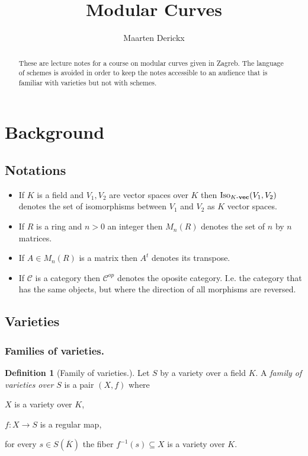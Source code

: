 \documentclass[a4paper,12pt,reqno]{amsart}
\title{Modular Curves}
\author{Maarten Derickx}
\newcommand{\IsoKVec}[1]{\mathrm{Iso}_{#1 {\bf\text{-}vec}}}
\newcommand{\transpose}{t}
\theoremstyle{definition}
\newtheorem{definition}[lemma]{Definition}
\numberwithin{lemma}{section}
\numberwithin{equation}{section}
\numberwithin{figure}{section}
\begin{document}
\begin{abstract}
These are lecture notes for a course on modular curves given in Zagreb. The language of schemes is avoided in order to keep the notes accessible to an audience that is familiar with varieties but not with schemes.
\end{abstract}

\maketitle
\setcounter{tocdepth}{3}
\tableofcontents

\section{Background}

\subsection{Notations}

\begin{itemize}
	\item If $K$ is a field and $V_1,V_2$ are vector spaces over $K$ then $\IsoKVec{K}(V_1,V_2)$ denotes the set of isomorphisms between $V_1$ and $V_2$ as $K$ vector spaces.
	\item If $R$ is a ring and $n >0 $ an integer then $M_n(R)$ denotes the set of $n$ by $n$ matrices.
	\item If $A \in M_n(R)$ is a matrix then $A^\transpose$ denotes its transpose. 
	\item If $\mathcal C$ is a category then $\mathcal C^{op}$ denotes the oposite category. I.e. the  category that has the same objects, but where the direction of all morphisms are reversed.
\end{itemize}

\newpage
\subsection{Varieties}



\hspace{1em}

\subsubsection{Families of varieties.}
\begin{definition}[Family of varieties.]\label{def:family-of-varieties}
Let $S$ by a variety over a field $K$. A \textit{family of varieties over $S$} is a pair $(X,f)$ where 
\begin{defenum}
	\item $X$ is a variety over $K$,
	\item $f: X \to S$ is a regular map,
	\item for every $s \in S(\overline K)$ the fiber $f^{-1}(s) \subseteq X$ is a variety over $K$. \label{def:family-of-varieties-fibers}
\end{defenum}
\end{definition}
\end{document}

